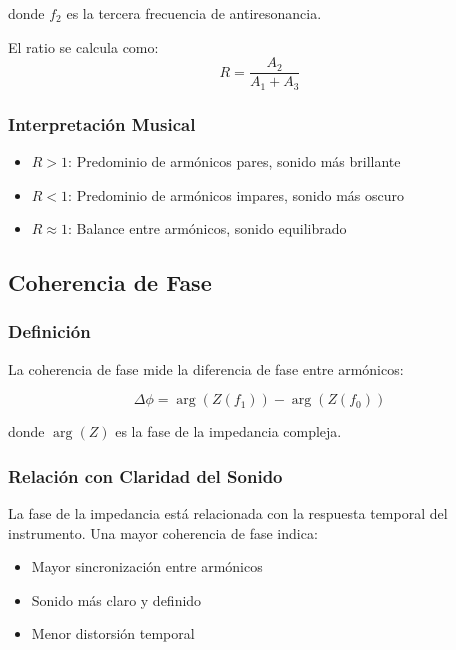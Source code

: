 \documentclass[12pt,a4paper,twocolumn]{article}
\newcommand{\impedance}{Z}
\newcommand{\freqzero}{f_0}
\newcommand{\freqone}{f_1}
\newcommand{\freqtwo}{f_2}
\begin{document}
donde $\freqtwo$ es la tercera frecuencia de antiresonancia.

El ratio se calcula como:
\begin{equation}
R = \frac{A_2}{A_1 + A_3}
\label{eq:ratio_calculo}
\end{equation}

\subsubsection{Interpretación Musical}

\begin{itemize}
    \item \textbf{$R > 1$}: Predominio de armónicos pares, sonido más brillante
    \item \textbf{$R < 1$}: Predominio de armónicos impares, sonido más oscuro
    \item \textbf{$R \approx 1$}: Balance entre armónicos, sonido equilibrado
\end{itemize}

\subsection{Coherencia de Fase}

\subsubsection{Definición}

La coherencia de fase mide la diferencia de fase entre armónicos:

\begin{equation}
\Delta\phi = \arg(\impedance(\freqone)) - \arg(\impedance(\freqzero))
\label{eq:phase_coherence}
\end{equation}

donde $\arg(\impedance)$ es la fase de la impedancia compleja.

\subsubsection{Relación con Claridad del Sonido}

La fase de la impedancia está relacionada con la respuesta temporal del instrumento. Una mayor coherencia de fase indica:

\begin{itemize}
    \item Mayor sincronización entre armónicos
    \item Sonido más claro y definido
    \item Menor distorsión temporal
\end{itemize}
\end{document}
